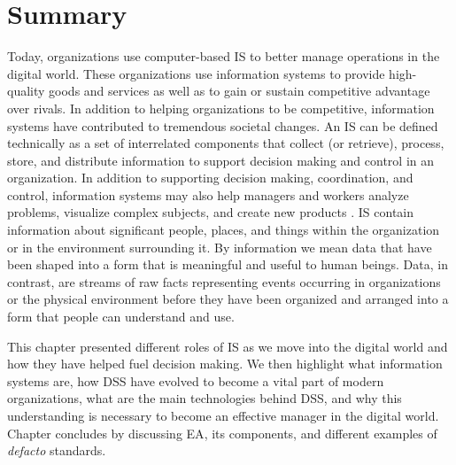 \documentclass[12pt,a4paper,final,twoside,onecolumn,titlepage]{book}
\begin{document}
\section{Summary}
Today, organizations use computer-based \gls{IS} to better manage operations in the digital world. These organizations use information systems to provide high-quality goods and services as well as to gain or sustain competitive advantage over rivals. In addition to helping organizations to be competitive, information systems have contributed to tremendous societal changes. An \gls{IS} can be defined technically as a set of interrelated components that collect (or retrieve), process, store, and distribute information to support decision making and control in an organization. In addition to supporting decision making, coordination, and control, information systems may also help managers and workers analyze problems, visualize complex subjects, and create new products \cite{MIS-DigitalFirm}. \gls{IS} contain information about significant people, places, and things within the organization or in the environment surrounding it. By information we mean data that have been shaped into a form that is meaningful and useful to human beings. Data, in contrast, are streams of raw facts representing events occurring in organizations or the physical environment before they have been organized and arranged into a form that people can understand and use. 

This chapter presented different roles of \gls{IS} as we move into the digital world and how they have helped fuel decision making. We then highlight what information systems are, how \gls{DSS} have evolved to become a vital part of modern organizations, what are the main technologies behind \gls{DSS}, and why this understanding is necessary to become an effective manager in the digital world. Chapter concludes by discussing \gls{EA}, its components, and different examples of \textit{defacto} standards.
\end{document}
